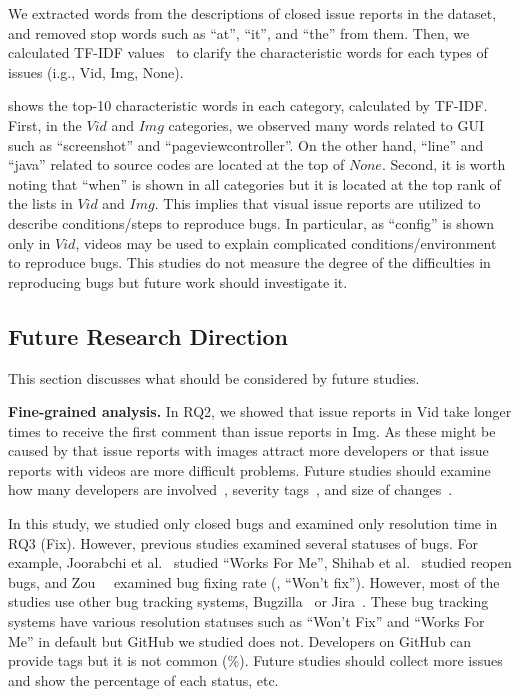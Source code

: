 We extracted words from the descriptions of closed issue reports in the dataset, and  removed stop words such as ``at'', ``it'', and ``the'' from them. 
Then, we calculated TF-IDF values~\citep{salton1988-tfidf} to clarify the characteristic words for each types of issues (i.g., Vid, Img, None). 

 shows the top-10 characteristic words in each category, calculated by TF-IDF.
First, in the $Vid$ and $Img$ categories, we observed many words related to GUI such as ``screenshot'' and ``pageviewcontroller''. 
On the other hand, ``line'' and ``java'' related to source codes are located at the top of $None$.
Second, it is worth noting that ``when'' is shown in all categories but it is located at the top rank of the lists in $Vid$ and $Img$. This implies that visual issue reports are utilized to describe conditions/steps to reproduce bugs. In particular, as ``config'' is shown only in $Vid$, videos may be used to explain complicated conditions/environment to reproduce bugs. This studies do not measure the degree of the difficulties in reproducing bugs but future work should investigate it.



\subsection{Future Research Direction}
This section discusses what should be considered by future studies. 

\noindent
\textbf{Fine-grained analysis. }
In RQ2, we showed that issue reports in Vid take longer times to receive the first comment than issue reports in Img. 
As these might be caused by that issue reports with images attract more developers or that issue reports with videos are more difficult problems.
Future studies should examine how many developers are involved~\citep{DBLP:conf/icsm/BavotaR15}, severity tags~\citep{DBLP:conf/issre/ZhouNG15}, and size of changes~\citep{DBLP:conf/kbse/HattoriL08}.

In this study, we studied only closed bugs and examined only resolution time in RQ3 (Fix). However, previous studies examined several statuses of bugs. For example, Joorabchi et al.~\citep{DBLP:conf/msr/JoorabchiMM14} studied ``Works For Me'', Shihab et al.~\citep{DBLP:journals/ese/ShihabIKIOAHM13} studied reopen bugs, and Zou~\et~\citep{DBLP:conf/compsac/ZouXZCL15} examined bug fixing rate (\eg, ``Won't fix''). However, most of the studies use other bug tracking systems, Bugzilla~\citep{Bugzilla} or Jira~\citep{JIRA}. These bug tracking systems have various resolution statuses such as ``Won't Fix'' and ``Works For Me''  in default but GitHub we studied does not. Developers on GitHub can provide tags but it is not common (\%). Future studies should collect more issues and show the percentage of each status, etc. 


